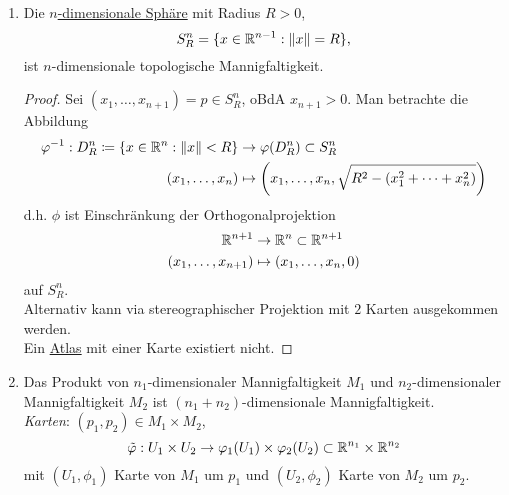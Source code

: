 \begin{example}
\begin{enumerate}
    \item Die \hyperref[bsp:einheitssphaere]{$ n $-dimensionale Sphäre} mit Radius $ R > 0 $,
    \begin{equation*}
      S^n_R = \{ x \in \mathbb{R}^{n-1} : \Vert x \Vert = R \}\text{,}
    \end{equation*}
    ist $ n $-dimensionale topologische Mannigfaltigkeit.
    \begin{proof}
      Sei $ (x_1, \dots, x_{n+1}) = p \in S^n_R $, oBdA $ x_{n+1} > 0 $. Man betrachte die Abbildung
      \begin{align*}
        \varphi^{-1} : D^n_R \coloneqq \left\{ x \in \mathbb{R}^n : \Vert x \Vert < R \right\} &\to \varphi(D^n_R) \subset S^n_R \\
          (x_1, \dots, x_n) &\mapsto \left(x_1, \dots, x_n, \sqrt{R^2-(x_1^2 + \cdots + x_n^2)}\right)
      \end{align*}
      d.h. $ \phi $ ist Einschränkung der Orthogonalprojektion
      \begin{align*}
        \mathbb{R}^{n+1} &\to \mathbb{R}^n \subset \mathbb{R}^{n+1} \\
          (x_1, \dots, x_{n+1}) &\mapsto (x_1, \dots, x_n, 0)
      \end{align*}
      auf $ S_R^n $. \\
      Alternativ kann via stereographischer Projektion mit $ 2 $ Karten ausgekommen werden. \\
      Ein \hyperref[def:atlas]{Atlas} mit einer Karte existiert nicht.
    \end{proof}
    \item Das Produkt von $ n_1 $-dimensionaler Mannigfaltigkeit $ M_1 $ und $ n_2 $-dimensionaler Mannigfaltigkeit $ M_2 $ ist $ (n_1+n_2) $-dimensionale Mannigfaltigkeit. \\
    \emph{Karten}: $ (p_1, p_2) \in M_1 \times M_2 $,
    \begin{equation*}
      \tilde{\varphi} : U_1 \times U_2 \to \varphi_1(U_1) \times \varphi_2(U_2) \subset \mathbb{R}^{n_1} \times \mathbb{R}^{n_2}
    \end{equation*}
    mit $ (U_1, \phi_1) $ Karte von $ M_1 $ um $ p_1 $ und $ (U_2, \phi_2) $ Karte von $ M_2 $ um $ p_2 $.
  \end{enumerate}
\end{example}

